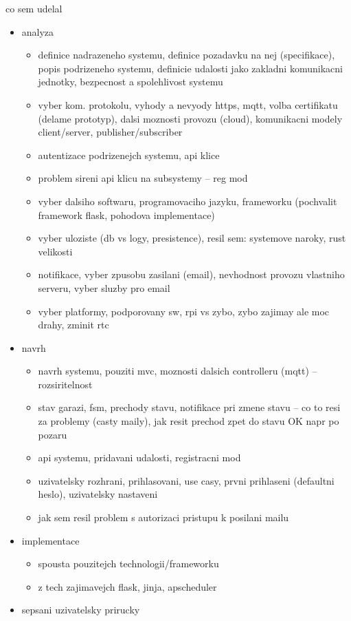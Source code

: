 co sem udelal

\begin{itemize}
    \item analyza
    \begin{itemize}
    \item definice nadrazeneho systemu, definice pozadavku na nej (specifikace), popis podrizeneho systemu, definicie udalosti jako zakladni komunikacni jednotky, bezpecnost a spolehlivost systemu
    \item vyber kom. protokolu, vyhody a nevyody https, mqtt, volba certifikatu (delame prototyp), dalsi moznosti provozu (cloud), komunikacni modely client/server, publisher/subscriber
    \item autentizace podrizenejch systemu, api klice
    \item problem sireni api klicu na subsystemy -- reg mod
    \item vyber dalsiho softwaru, programovaciho jazyku, frameworku (pochvalit framework flask, pohodova implementace)
    \item vyber uloziste (db vs logy, presistence), resil sem: systemove naroky, rust velikosti
    \item notifikace, vyber zpusobu zasilani (email), nevhodnost provozu vlastniho serveru, vyber sluzby pro email
    \item vyber platformy, podporovany sw, rpi vs zybo, zybo zajimay ale moc drahy, zminit rtc
    \end{itemize}
    \item navrh
    \begin{itemize}
        \item navrh systemu, pouziti mvc, moznosti dalsich controlleru (mqtt) -- rozsiritelnost
        \item stav garazi, fsm, prechody stavu, notifikace pri zmene stavu -- co to resi za problemy (casty maily), jak resit prechod zpet do stavu OK napr po pozaru
        \item api systemu, pridavani udalosti, registracni mod
        \item uzivatelsky rozhrani, prihlasovani, use casy, prvni prihlaseni (defaultni heslo), uzivatelsky nastaveni
        \item jak sem resil problem s autorizaci pristupu k posilani mailu
    \end{itemize}
    \item implementace
    \begin{itemize}
        \item spousta pouzitejch technologii/frameworku
        \item z tech zajimavejch flask, jinja, apscheduler
    \end{itemize}
    \item sepsani uzivatelsky prirucky
\end{itemize}